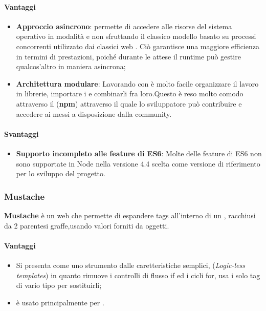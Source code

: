 \paragraph{Vantaggi} 
\begin{itemize}
\item \textbf{Approccio asincrono}:  permette di accedere alle risorse del sistema operativo in modalità  e non sfruttando il classico modello basato su processi concorrenti utilizzato dai classici web . Ciò garantisce una maggiore efficienza in termini di prestazioni, poiché durante le attese il runtime può gestire qualcos’altro in maniera asincrona;
\item \textbf{Architettura modulare}: Lavorando con  è molto facile organizzare il lavoro in librerie, importare i  e combinarli fra loro.Questo è reso molto comodo attraverso il  (\textbf{npm}) attraverso il quale lo sviluppatore può contribuire e accedere ai  messi a disposizione dalla community.
\end{itemize}

\paragraph{Svantaggi}
\begin{itemize}
\item \textbf{Supporto incompleto alle feature di ES6}: Molte delle feature di ES6 non
sono supportate in Node nella versione 4.4 scelta come versione di riferimento per
lo sviluppo del progetto.
\end{itemize}

\subsubsection{Mustache}
\textbf{Mustache} è un web  che permette di espandere tags all'interno di un , racchiusi da 2 parentesi graffe,usando valori forniti da oggetti.

\paragraph{Vantaggi} 
\begin{itemize}

\item Si presenta come uno strumento dalle caretteristiche semplici, (\emph{Logic-less templates}) in quanto rimuove i controlli di flusso if ed i cicli for, usa i solo tag di vario tipo per sostituirli;

\item è usato principalmente per .
\end{itemize}

